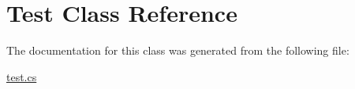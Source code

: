 \hypertarget{class_test}{}\section{Test Class Reference}
\label{class_test}


The documentation for this class was generated from the following file\+:\begin{DoxyCompactItemize}
\item 
\hyperlink{test_8cs}{test.\+cs}\end{DoxyCompactItemize}
